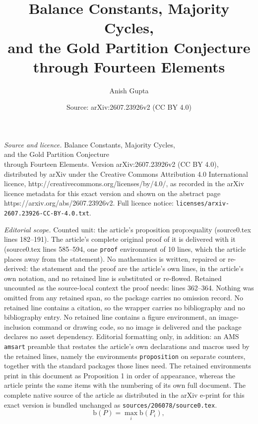 \documentclass[10pt,a4paper]{amsart}
\title{Balance Constants, Majority Cycles,\\ and the Gold Partition Conjecture\\ through Fourteen Elements}
\author{Anish Gupta}
\date{Source: arXiv:2607.23926v2 (CC BY 4.0)}
\newcommand{\bal}{\mathrm{b}}
\begin{document}
\maketitle

\noindent\emph{Source and licence.} Balance Constants, Majority Cycles,\\ and the Gold Partition Conjecture\\ through Fourteen Elements. Version arXiv:2607.23926v2 (CC BY 4.0), distributed by arXiv under the Creative Commons Attribution 4.0 International licence, http://creativecommons.org/licenses/by/4.0/, as recorded in the arXiv licence metadata for this exact version and shown on the abstract page https://arxiv.org/abs/2607.23926v2. Full licence notice: \texttt{licenses/arxiv-2607.23926-CC-BY-4.0.txt}.\par\smallskip

\noindent\textit{Editorial scope.} Counted unit: the article's proposition prop:equality (source0.tex lines 182--191). The article's complete original proof of it is delivered with it (source0.tex lines 585--594, one \texttt{proof} environment of 10 lines, which the article places away from the statement). No mathematics is written, repaired or re-derived: the statement and the proof are the article's own lines, in the article's own notation, and no retained line is substituted or re-flowed.  Retained uncounted as the source-local context the proof needs: lines 362--364.  Nothing was omitted from any retained span, so the package carries no omission record.  No retained line contains a citation, so the wrapper carries no bibliography and no bibliography entry.  No retained line contains a figure environment, an image-inclusion command or drawing code, so no image is delivered and the package declares no asset dependency.  Editorial formatting only, in addition: an AMS \texttt{amsart} preamble that restates the article's own declarations and macros used by the retained lines, namely the environments \texttt{proposition} on separate counters, together with the standard packages those lines need.  The retained environments print in this document as Proposition 1 in order of appearance, whereas the article prints the same items with the numbering of its own full document.  The complete native source of the article as distributed in the arXiv e-print for this exact version is bundled unchanged as \texttt{sources/206078/source0.tex}.
\begin{equation}\label{eq:sumbal}
  \bal(P)=\max_i\bal(P_i),
\end{equation}
\end{document}

